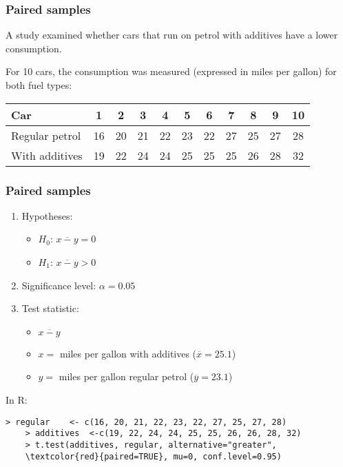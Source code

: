\documentclass[aspectratio=169]{beamer}
\begin{document}
\begin{frame}
  \frametitle{Paired samples}
  
  A study examined whether cars that run on petrol with additives have a lower consumption.
  
  For 10 cars, the consumption was measured (expressed in miles per gallon) for both fuel types:
  
  \vspace{.5cm}
  \centering
  \begin{tabular}{|l|c|c|c|c|c|c|c|c|c|c|}
    \hline
    Car           & 1  & 2  & 3  & 4  & 5  & 6  & 7  & 8  & 9  & 10 \\ \hline
    Regular petrol & 16 & 20 & 21 & 22 & 23 & 22 & 27 & 25 & 27 & 28 \\ \hline
    With additives & 19 & 22 & 24 & 24 & 25 & 25 & 25 & 26 & 28 & 32 \\ \hline
  \end{tabular} 
\end{frame}

\begin{frame}[fragile]
  \frametitle{Paired samples}
  \begin{enumerate}
    \item Hypotheses:
    \begin{itemize}
      \item $H_0$: $\overline{x-y} = 0$
      \item $H_1$: $\overline{x-y} > 0$
    \end{itemize}
    \item Significance level: $\alpha = 0.05$
    \item Test statistic:
    \begin{itemize}
      \item $\overline{x-y}$
      \item $x =$ miles per gallon with additives ($\overline{x}=25.1$)
      \item $y =$ miles per gallon regular petrol ($\overline{y}=23.1$)
    \end{itemize}
  \end{enumerate}
  \vfill
  In R:
  {\footnotesize
    \begin{Verbatim}[commandchars=\\\{\}]
    > regular    <- c(16, 20, 21, 22, 23, 22, 27, 25, 27, 28)
    > additives  <-c(19, 22, 24, 24, 25, 25, 26, 26, 28, 32)
    > t.test(additives, regular, alternative="greater",
    \textcolor{red}{paired=TRUE}, mu=0, conf.level=0.95)
    \end{Verbatim}
  }
\end{frame}
\end{document}
